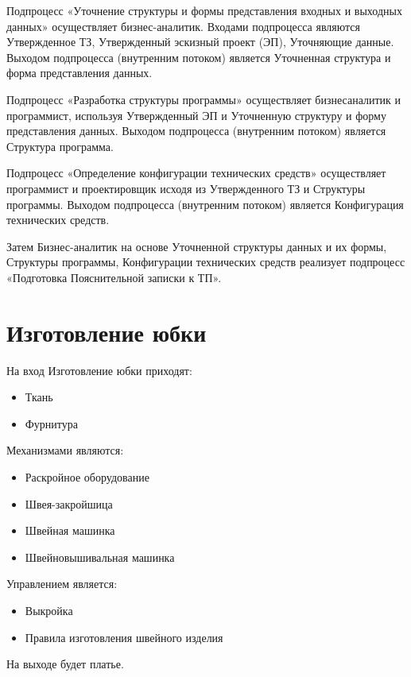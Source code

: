 Подпроцесс «Уточнение структуры и формы представления входных и
выходных данных» осуществляет бизнес-аналитик.
Входами подпроцесса  являются Утвержденное ТЗ, Утвержденный эскизный проект (ЭП),
Уточняющие данные.
Выходом подпроцесса (внутренним потоком) является Уточненная структура и форма представления данных.

Подпроцесс «Разработка структуры программы» осуществляет бизнесаналитик и программист, используя
Утвержденный ЭП и Уточненную структуру и форму представления данных.
Выходом подпроцесса (внутренним потоком) является Структура программа.

Подпроцесс «Определение конфигурации технических средств»
осуществляет программист и проектировщик исходя из Утвержденного ТЗ и
Структуры программы.
Выходом подпроцесса (внутренним потоком) является Конфигурация технических средств.

Затем Бизнес-аналитик на основе Уточненной структуры данных и их
формы, Структуры программы, Конфигурации технических средств реализует
подпроцесс «Подготовка Пояснительной записки к ТП».



\newpage

\section{Изготовление юбки}

На вход Изготовление юбки приходят:
\begin{itemize}
	\item Ткань
	\item Фурнитура
\end{itemize}

Механизмами являются:
\begin{itemize}
	\item Раскройное оборудование
	\item Швея-закройшица
	\item Швейная машинка
	\item Швейновышивальная машинка
\end{itemize}

Управлением является:
\begin{itemize}
	\item Выкройка
	\item Правила изготовления швейного изделия
\end{itemize}

На выходе будет платье.

